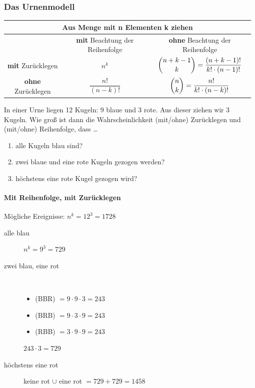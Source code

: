 \documentclass[11pt, a4paper]{article}
\begin{document}
\subsubsection{Das Urnenmodell}
\begin{tabular}{|c|c|c|}
	\hline
	\multicolumn{3}{|c|}{Aus Menge mit \textbf{n} Elementen \textbf{k} ziehen} \\
	\hline
	 & \textbf{mit} Beachtung der Reihenfolge & \textbf{ohne} Beachtung der Reihenfolge \\
	\hline
	\textbf{mit} Zurücklegen & $n^k$ & $\dbinom{n+k-1}{k} = \dfrac{(n+k-1)!}{k!\cdot (n-1)!}$ \\
	\hline
	\textbf{ohne} Zurücklegen & $\dfrac{n!}{(n-k)!}$ & $\dbinom{n}{k} = \dfrac{n!}{k!\cdot (n-k)!}$ \\
	\hline
\end{tabular}

In einer Urne liegen 12 Kugeln: 9 blaue und 3 rote. Aus dieser ziehen wir 3 Kugeln. Wie groß ist dann die Wahrscheinlichkeit (mit/ohne) Zurücklegen und (mit/ohne) Reihenfolge, dass \dots
\begin{enumerate}
	\item alle Kugeln blau sind?
	\item zwei blaue und eine rote Kugeln gezogen werden?
	\item höchstens eine rote Kugel gezogen wird?
\end{enumerate}

\paragraph{Mit Reihenfolge, mit Zurücklegen}
Mögliche Ereignisse: $n^k = 12^3 = 1728$
\begin{description}
	\item[alle blau] $n^k = 9^3 = 729$
	\item[zwei blau, eine rot] \ 
		\begin{itemize}
			\item (BBR) $= 9 \cdot 9 \cdot 3 = 243$
			\item (BRB) $= 9 \cdot 3 \cdot 9 = 243$
			\item (RBB) $= 3 \cdot 9 \cdot 9 = 243$
		\end{itemize}
		$243 \cdot 3 = 729$
	\item[höchstens eine rot] keine rot $\cup$ eine rot $= 729+729 = 1458$
\end{description}
\end{document}
